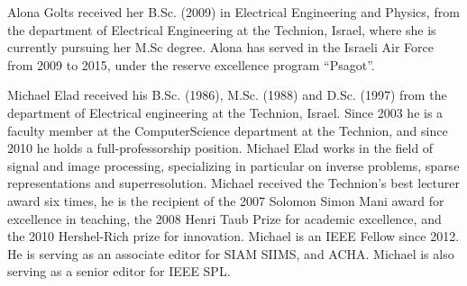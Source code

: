 \documentclass[journal]{IEEEtran}
\begin{document}

%
%

%

%

\vspace*{-30pt}

\begin{IEEEbiography}{Alona Golts}
received her B.Sc. (2009) in Electrical Engineering and Physics,
from the department of Electrical Engineering at the Technion,
Israel, where she is currently pursuing her M.Sc degree.
Alona has served in the Israeli Air Force from 2009 to 2015, under the reserve excellence program ``Psagot''.
\end{IEEEbiography}

\vspace*{-30pt}

\begin{IEEEbiography}{Michael Elad}
received his B.Sc. (1986), M.Sc.
(1988) and D.Sc. (1997) from the department of
Electrical engineering at the Technion, Israel. Since
2003 he is a faculty member at the ComputerScience
department at the Technion, and since 2010
he holds a full-professorship position.
Michael Elad works in the field of signal and
image processing, specializing in particular on inverse
problems, sparse representations and superresolution.
Michael received the Technion’s best
lecturer award six times, he is the recipient of the
2007 Solomon Simon Mani award for excellence in teaching, the 2008 Henri
Taub Prize for academic excellence, and the 2010 Hershel-Rich prize for
innovation. Michael is an IEEE Fellow since 2012. He is serving as an
associate editor for SIAM SIIMS, and ACHA. Michael is also serving as
a senior editor for IEEE SPL.
\end{IEEEbiography}
\end{document}
